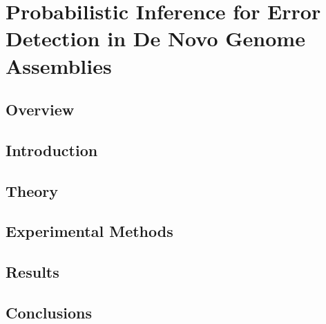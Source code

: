 \chapter{Probabilistic Inference for Error Detection in De Novo Genome Assemblies}
\section{Overview}
\section{Introduction}
\section{Theory}
\section{Experimental Methods}
\section{Results}
\section{Conclusions}